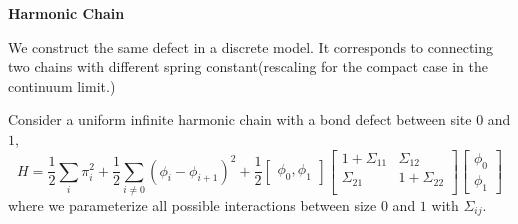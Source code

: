 \documentclass{article}
\begin{document}
{\bf Harmonic Chain} 

We construct the same defect in a discrete model. It corresponds to connecting two chains with different spring constant(rescaling for the compact case in the continuum limit.)

Consider a uniform infinite harmonic chain with a bond defect between site $0$ and $1$,
\begin{equation}
  H = \frac{1}{2} \sum_i \pi_i^2  +  \frac{1}{2} \sum_{i\ne 0 }  ( \phi_i - \phi_{i+1} )^2  +  \frac{1}{2} \begin{bmatrix}  \phi_0, \phi_1 \end{bmatrix}
\begin{bmatrix}
1 + \Sigma_{11}  & \Sigma_{12} \\
\Sigma_{21} &  1 + \Sigma_{22} \\
\end{bmatrix}
\begin{bmatrix}
\phi_0 \\
\phi_1 
\end{bmatrix}
\end{equation}
where we parameterize all possible interactions between size $0$ and $1$ with $\Sigma_{ij}$. 
\end{document}
